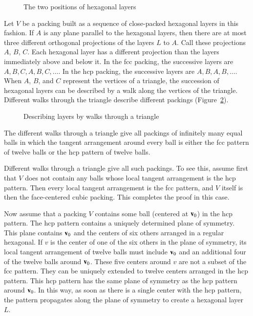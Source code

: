 \begin{figure}[htb]
  \centering
  \caption{The two positions of hexagonal layers}
  \label{fig:two-holes}
\end{figure}

Let $V$ be a packing built as a sequence of close-packed hexagonal
layers in this fashion.  If $A$ is any plane parallel to the hexagonal
layers, then there are at most three different orthogonal projections
of the layers $L$ to $A$.  Call these projections $A$, $B$, $C$.  Each
hexagonal layer has a different projection than the layers immediately
above and below it.  In the fcc packing, the successive layers are
$A,B,C,A,B,C,\ldots$.  In the hcp packing, the successive layers are
$A,B,A,B,\ldots$.  When $A$, $B$, and $C$ represent the vertices of a
triangle, the succession of hexagonal layers can be described by a
walk along the vertices of the triangle. Different walks through the
triangle describe different packings (Figure~\ref{fig:fcc-tri}).

\begin{figure}[htb]
  \centering
  \caption{Describing layers by walks through a triangle}
  \label{fig:fcc-tri}
\end{figure}

The different walks through a triangle give all packings of infinitely
many equal balls in which the tangent arrangement around every ball is
either the fcc pattern of twelve balls or the hcp pattern of twelve
balls.

Different walks through a triangle give all such packings.  To see
this, assume first that $V$ does not contain any balls whose local
tangent arrangement is the hcp pattern.  Then every local tangent
arrangement is the fcc pattern, and $V$ itself is then the
face-centered cubic packing.  This completes the proof in this case.

Now assume that a packing $V$ contains some ball (centered at ${\mathbf v}_0$)
in the hcp pattern. The hcp pattern contains a uniquely determined
plane of symmetry. This plane contains ${\mathbf v}_0$ and the centers of six
others arranged in a regular hexagonal. If $v$ is the center of one of
the six others in the plane of symmetry, its local tangent arrangement
of twelve balls must include ${\mathbf v}_0$ and an additional four of the
twelve balls around ${\mathbf v}_0$. These five centers around $v$ are not a
subset of the fcc pattern. They can be uniquely extended to twelve
centers arranged in the hcp pattern. This hcp pattern has the same
plane of symmetry as the hcp pattern around ${\mathbf v}_0$. In this way, as
soon as there is a single center with the hcp pattern, the pattern
propagates along the plane of symmetry to create a hexagonal layer
$L$.

